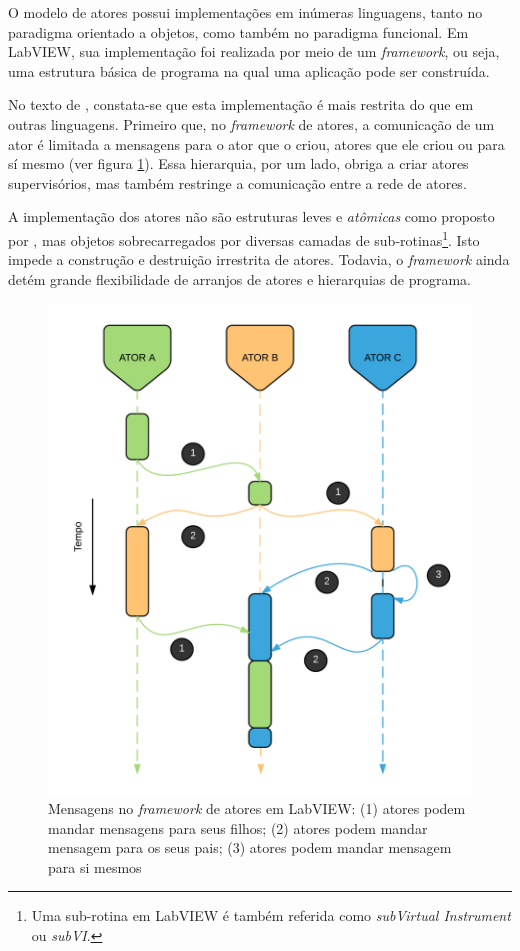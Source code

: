 O modelo de atores possui implementações em inúmeras linguagens, tanto no paradigma orientado a objetos, como também no paradigma funcional. Em LabVIEW, sua implementação foi realizada por meio de um \textit{framework}, ou seja, uma estrutura básica de programa na qual uma aplicação pode ser construída.

No texto de \citet{smithAF}, constata-se que esta implementação é mais restrita do que em outras linguagens. Primeiro que, no \textit{framework} de atores, a comunicação de um ator é limitada a mensagens para o ator que o criou, atores que ele criou ou para sí mesmo (ver figura \ref{fig:actormsg}). Essa hierarquia, por um lado, obriga a criar atores supervisórios, mas também restringe a comunicação entre a rede de atores.

A implementação dos atores não são estruturas leves e \textit{atômicas} como proposto por \citet{hewitt1973session}, mas objetos sobrecarregados por diversas camadas de sub-rotinas\footnote{Uma sub-rotina em LabVIEW é também referida como \textit{subVirtual Instrument} ou \textit{subVI}.}. Isto impede a construção e destruição irrestrita de atores. Todavia, o \textit{framework} ainda detém grande flexibilidade de arranjos de atores e hierarquias de programa.


\begin{figure}[h!]
    \centering
    \includegraphics[width=0.9\linewidth]{fig/actormsg}
    \caption{Mensagens no \textit{framework} de atores em LabVIEW: (1) atores podem mandar mensagens para seus filhos; (2) atores podem mandar mensagem para os seus pais; (3) atores podem mandar mensagem para si mesmos}
    \label{fig:actormsg}
\end{figure}

